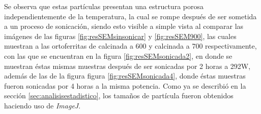 \documentclass[../main.tex]{subfiles}
\begin{document}
Se observa que estas partículas presentan una estructura porosa independientemente de la temperatura, la cual se rompe después de ser sometida a un proceso de sonicación, siendo esto visible a simple vista al comparar las imágenes de las figuras \ref{fig:resSEMsinsonicar} y \ref{fig:resSEM900}, las cuales muestran a las ortoferritas de \neod{} calcinada a 600\gradoC{} y \sama{} calcinada a 700\gradoC{} respectivamente, con las que se encuentran en la figura \ref{fig:resSEMsonicada2}, en donde se muestran éstas mismas muestras después de ser sonicadas por 2 horas a 292W, además de las de la figura figura \ref{fig:resSEMsonicada4}, donde éstas muestras fueron sonicadas por 4 horas a la misma potencia.
Como ya se describió en la sección \ref{sec:analisisestadistico}, los tamaños de partícula fueron obtenidos haciendo uso de \textit{ImageJ}.
\end{document}
